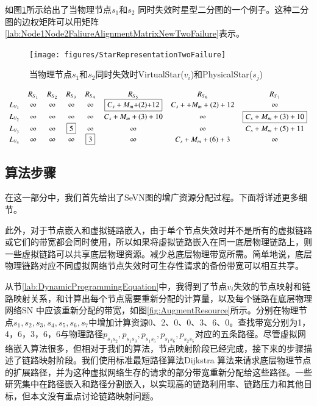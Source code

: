 \label{sec:multiplePhysicalNodeFailure}
如图\ref{fig:StarRepresentationTwoFailure}所示给出了当物理节点$s_1$和$s_2$ 同时失效时星型二分图的一个例子。这种二分图的边权矩阵可以用矩阵\ref{lab:Node1Node2FaliureAlignmentMatrixNewTwoFailure}表示。
\begin{figure}[htbp]
\centering
\texttt{[image: figures/StarRepresentationTwoFailure]}\\
  \caption{当物理节点$s_1$和$s_2$同时失效时VirtualStar($v_i$)和PhysicalStar($s_j$)}\label{fig:StarRepresentationTwoFailure}
\end{figure}
\begin{equation*}
\small{
 {\begin{array}{*{20}{c}}
&R_{S_1}&R_{S_2}&R_{S_3}&R_{S_4}&R_{S_5}&R_{S_6}&R_{S_{7}}\\
{L_{V_1}}&\infty&\infty&\infty&\infty&\fbox{$C_{s}+M_{m}$+(2)+12}&C_{s}++M_{m}+(2)+12&\infty\\
L_{V_2}&\infty&\infty&\infty&\infty&C_{s}+M_{m}+(3)+10&\infty&\fbox{$C_{s}+M_{m}+(3)+10$}\\
L_{V_3}&\infty&\infty&\fbox{5}&\infty&\infty&\infty&C_{s}+M_{m}+(5)+11\\
L_{V_4}&\infty&\infty&\infty&\fbox{3}&\infty&C_{s}+M_{m}+(6)+3&\infty\\
\end{array}}
}
\label{lab:Node1Node2FaliureAlignmentMatrixNewTwoFailure}
\end{equation*}
\subsection{算法步骤}
在这一部分中，我们首先给出了SeVN图的增广资源分配过程。下面将详述更多细节。

此外，对于节点嵌入和虚拟链路嵌入，由于单个节点失效时并不是所有的虚拟链路或它们的带宽都会同时使用，所以如果将虚拟链路嵌入在同一底层物理链路上，则一些虚拟链路可以共享底层物理资源。减少总底层物理带宽所需。简单地说，底层物理链路对应不同虚拟网络节点失效时可生存性请求的备份带宽可以相互共享。

从节\ref{lab:DynamicProgrammingEquation}中，我得到了节点$v_i$失效的节点映射和链路映射关系，和计算出每个节点需要重新分配的计算量，以及每个链路在底层物理网络SN 中应该重新分配的带宽，如图\ref{fig:AugmentResource}所示。分别在物理节点$s_1,s_2,s_3,s_4,s_5,s_6,s_7$中增加计算资源0、2、0、0、3、6、0。查找带宽分别为1，4，6，3，6，6与物理路径$p_{s_1s_2},p_{s_1s_3},p_{s_1s_5},p_{s_1s_6},p_{s_2s_5}$对应的五条路径。尽管虚拟网络嵌入算法很多，但相对于我们的算法，节点映射阶段已经完成，接下来的步骤描述了链路映射阶段。我们使用标准最短路径算法Dijkstra 算法\cite{skiena1990dijkstra}来请求底层物理节点的扩展路径，并为这种虚拟网络生存的请求的部分带宽重新分配给这些路径。一些研究\cite{yu2008rethinking}集中在路径嵌入和路径分割嵌入，以实现高的链路利用率、链路压力和其他目标，但本文没有重点讨论链路映射问题。

